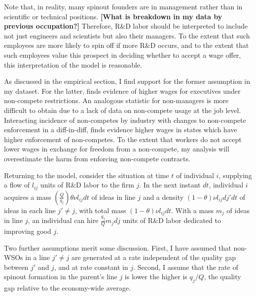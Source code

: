 \documentclass[12pt,english]{article}
\theoremstyle{remark}
\begin{document}
Note that, in reality, many spinout founders are in management rather than in scientific or technical positions. \textbf{[What is breakdown in my data by previous occupation?] }Therefore, R\&D labor should be interpreted to include not just engineers and scientists but also their managers. To the extent that such employees are more likely to spin off if more R\&D occurs, and to the extent that such employees value this prospect in deciding whether to accept a wage offer, this interpretation of the model is reasonable. 

As discussed in the empirical section, I find support for the former assumption in my dataset. For the latter, \cite{shi_restrictions_2018} finds evidence of higher wages for executives under non-compete restrictions. An analogous statistic for non-managers is more difficult to obtain due to a lack of data on non-compete usage at the job level. Interacting incidence of non-competes by industry with changes to non-compete enforcement in a diff-in-diff, \cite{starr_consider_2018} finds evidence higher wages in states which have higher enforcement of non-competes. To the extent that workers do not accept lower wages in exchange for freedom from a non-compete, my analysis will overestimate the harm from enforcing non-compete contracts. 

Returning to the model, consider the situation at time $t$ of individual $i$, supplying a flow of $l_{ij}$ units of R\&D labor to the firm $j$. In the next instant $dt$, individual $i$ acquires a mass $(\frac{Q}{q_j}) \theta \nu l_{ij} dt$ of ideas in line $j$ and a density $(1-\theta)\nu l_{ij} dj' dt$ of ideas in each line $j' \ne j$, with total mass $(1-\theta) \nu l_{ij} dt$. With a mass $m_j$ of ideas in line $j$, an individual can hire $\frac{q_j}{Q}m_jdj$ units of R\&D labor dedicated to improving good $j$.  

Two further assumptions merit some discussion. First, I have assumed that non-WSOs in a line $j' \ne j$ are generated at a rate independent of the quality gap between $j'$ and $j$, and at rate constant in $j$. Second, I assume that the rate of spinout formation in the parent's line $j$ is lower the higher is $q_j/Q$, the quality gap relative to the economy-wide average. 
\end{document}
